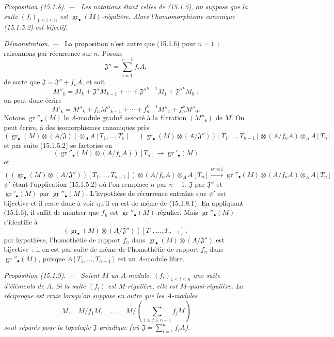 \documentclass[10pt,oneside]{book}
\makeatletter
\newcommand{\gr}{\operatorname{gr}}
\newcommand{\setmanualcurrentlabel}[1]{\def\@currentlabel{#1}}
\newenvironment{proposition}[1][]{%
  \setmanualcurrentlabel{#1}\par\medskip\noindent\itshape Proposition (#1). ---\ }{\par}
\newenvironment{proof}{%
  \par\medskip\noindent\textit{Démonstration. ---\ }}{\par}
\makeatother
\begin{document}
\begin{proposition}[15.1.8]
\label{0.15.1.8-fr}
Les notations étant celles de (15.1.5), on suppose que la suite
$(f_i)_{1\leq i\leq n}$ est $\gr_\bullet(M)$-régulière. Alors
l'homomorphisme canonique (15.1.5.2) est bijectif.
\end{proposition}

\begin{proof}
La proposition n'est autre que (15.1.6) pour $n=1$~; raisonnons par récurrence
sur $n$. Posons
\[
  \mathfrak{J}''=\sum_{i=1}^{n-1}f_iA,
\]
de sorte que $\mathfrak{J}=\mathfrak{J}''+f_nA$, et soit
\[
  M''_k=M_k+\mathfrak{J}''M_{k-1}+\cdots+
  \mathfrak{J}''^{k-1}M_1+\mathfrak{J}''^kM_0~;
\]
on peut donc écrire
\[
  M'_k=M''_k+f_nM''_{k-1}+\cdots+f_n^{k-1}M''_1+f_n^kM''_0.
\]
Notons $\gr''_\bullet(M)$ le $A$-module gradué associé à la filtration
$(M''_k)$ de $M$. On peut écrire, à des isomorphismes canoniques près
\[
  (\gr_\bullet(M)\otimes(A/\mathfrak{J}))\otimes_A A[T_1,\ldots,T_n]
  =
  (\gr_\bullet(M)\otimes(A/\mathfrak{J}''))[T_1,\ldots,T_{n-1}]
  \otimes(A/f_nA)\otimes_A A[T_n]
\]
et par suite (15.1.5.2) se factorise en
\[
  (\gr''_\bullet(M)\otimes(A/f_nA))[T_n]\longrightarrow\gr'_\bullet(M)
  \tag{15.1.8.1}\label{0.15.1.8.1-fr}
\]
et
\[
  ((\gr_\bullet(M)\otimes(A/\mathfrak{J}''))[T_1,\ldots,T_{n-1}])
  \otimes(A/f_nA)\otimes_A A[T_n]
  \xrightarrow{\psi'\otimes1}
  \gr''_\bullet(M)\otimes(A/f_nA)\otimes_A A[T_n]
\]
$\psi'$ étant l'application (15.1.5.2) où l'on remplace $n$ par $n-1$,
$\mathfrak{J}$ par $\mathfrak{J}''$ et $\gr'_\bullet(M)$ par
$\gr''_\bullet(M)$. L'hypothèse de récurrence entraîne que $\psi'$ est
bijective et il reste donc à voir qu'il en est de même de (15.1.8.1). En
appliquant (15.1.6), il suffit de montrer que $f_n$ est
$\gr''_\bullet(M)$-régulier. Mais $\gr''_\bullet(M)$ s'identifie à
\[
  (\gr_\bullet(M)\otimes(A/\mathfrak{J}''))
  [T_1,\ldots,T_{n-1}]~;
\]
par hypothèse, l'homothétie de rapport $f_n$ dans
$\gr_\bullet(M)\otimes(A/\mathfrak{J}'')$ est bijective~; il en est par suite
de même de l'homothétie de rapport $f_n$ dans $\gr''_\bullet(M)$, puisque
$A[T_1,\ldots,T_{n-1}]$ est un $A$-module libre.
\end{proof}

\begin{proposition}[15.1.9]
\label{0.15.1.9-fr}
Soient $M$ un $A$-module, $(f_i)_{1\leq i\leq n}$ une suite d'éléments de $A$.
Si la suite $(f_i)$ est $M$-régulière, elle est $M$-quasi-régulière. La
réciproque est vraie lorsqu'on suppose en outre que les $A$-modules
\[
  M,\quad M/f_1M,\quad\ldots,\quad
  M/\left(\sum_{1\leq j\leq n-1}f_jM\right)
\]
sont séparés pour la topologie $\mathfrak{J}$-préadique (où
$\mathfrak{J}=\sum_{i=1}^n f_iA$).
\end{proposition}
\end{document}
